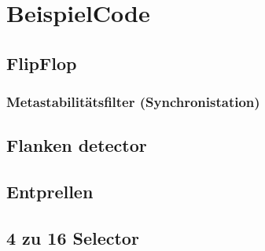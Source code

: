 \section{BeispielCode}
\subsection{FlipFlop}
%
\subsubsection{Metastabilitätsfilter (Synchronistation)}
%
\subsection{Flanken detector}
%
\subsection{Entprellen}
%
\subsection{4 zu 16 Selector}
%

